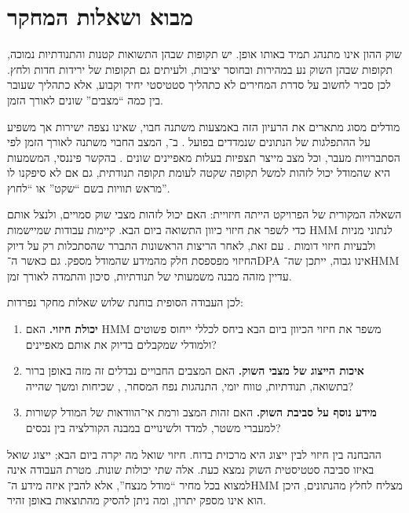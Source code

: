 \section{מבוא ושאלות המחקר}

שוק ההון אינו מתנהג תמיד באותו אופן. יש תקופות שבהן התשואות קטנות והתנודתיות נמוכה, תקופות שבהן השוק נע במהירות ובחוסר יציבות, ולעיתים גם תקופות של ירידות חדות ולחץ. לכן סביר לחשוב על סדרת המחירים לא כתהליך סטטיסטי יחיד וקבוע, אלא כתהליך שעובר בין כמה ``מצבים'' שונים לאורך הזמן.

מודלים מסוג  מתארים את הרעיון הזה באמצעות משתנה חבוי, שאינו נצפה ישירות אך משפיע על ההתפלגות של הנתונים שנמדדים בפועל \cite{hamilton1989new}. ב־, המצב החבוי משתנה לאורך הזמן לפי הסתברויות מעבר, וכל מצב מייצר תצפיות בעלות מאפיינים שונים \cite{rabiner1989tutorial,murphy2012machine}. בהקשר פיננסי, המשמעות היא שהמודל יכול לזהות למשל תקופה שקטה לעומת תקופה תנודתית, גם אם לא סיפקנו לו מראש תוויות בשם ``שקט'' או ``לחוץ''.

השאלה המקורית של הפרויקט הייתה חיזויית: האם  יכול לזהות מצבי שוק סמויים, ולנצל אותם כדי לשפר את חיזוי כיוון התשואה ביום הבא. קיימות עבודות שמיישמות HMM לנתוני מניות ולבעיות חיזוי דומות \cite{catello2023hmm}. עם זאת, לאחר הריצות הראשונות התברר שהסתכלות רק על דיוק החיזוי מפספסת חלק מהמידע שהמודל מספק. גם כאשר ה־DPA אינו גבוה, ייתכן שה־HMM עדיין מזהה מבנה משמעותי של תנודתיות, סיכון והתמדה לאורך זמן.

לכן העבודה הסופית בוחנת שלוש שאלות מחקר נפרדות:

\begin{enumerate}
    \item \textbf{יכולת חיזוי.} האם HMM משפר את חיזוי הכיוון ביום הבא ביחס לכללי ייחוס פשוטים ולמודלי  שמקבלים בדיוק את אותם מאפיינים?
    \item \textbf{איכות הייצוג של מצבי השוק.} האם המצבים החבויים נבדלים זה מזה באופן ברור בתשואה, תנודתיות, טווח יומי, התנהגות נפח המסחר, , שכיחות ומשך שהייה?
    \item \textbf{מידע נוסף על סביבת השוק.} האם זהות המצב ורמת אי־הוודאות של המודל קשורות למעברי משטר, למדד  ולשינויים במבנה הקורלציה בין נכסים?
\end{enumerate}

ההבחנה בין חיזוי לבין ייצוג היא מרכזית בדוח. חיזוי שואל מה יקרה ביום הבא; ייצוג שואל באיזו סביבה סטטיסטית השוק נמצא כעת. אלה שתי יכולות שונות. מטרת העבודה אינה למצוא בכל מחיר ``מודל מנצח'', אלא להבין איזה מידע ה־HMM מצליח לחלץ מהנתונים, היכן הוא אינו מספק יתרון, ומה ניתן להסיק מהתוצאות באופן זהיר.
